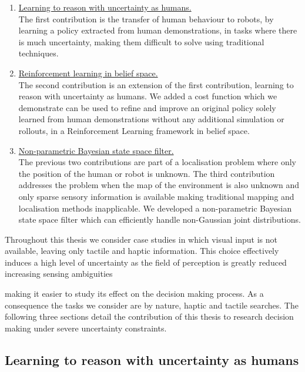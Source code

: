 \begin{enumerate}
 \item[\ref{sub:contr1}] \hyperref[sub:contr1]{Learning to reason with uncertainty as humans.}\\
 The first contribution is the transfer of human behaviour to robots, by learning a policy extracted from 
 human demonstrations, in tasks where there is much uncertainty, making them difficult to solve using traditional techniques.
 \item[\ref{sub:contr2}] \hyperref[sub:contr2]{Reinforcement learning in belief space.}\\
 The second contribution is an extension of the first contribution, learning to reason with uncertainty as humans.
 We added a cost function which we demonstrate can be used to refine and improve an original policy solely learned from human demonstrations
 without any additional simulation or rollouts, in a Reinforcement Learning framework in belief space. 
 \item[\ref{sub:contr3}] \hyperref[sub:contr3]{Non-parametric Bayesian state space filter.}\\
  The previous two contributions are part of a localisation problem where only the position of the human or robot is unknown.
  The third contribution addresses the problem when the map of the environment is also unknown and only sparse sensory information is available
  making traditional mapping and localisation methods inapplicable. We developed a non-parametric Bayesian state space filter which can efficiently
  handle non-Gaussian joint distributions. 
\end{enumerate}

Throughout this thesis we consider case studies in which visual input is not available, leaving only tactile and 
haptic information. This choice effectively induces a high level of uncertainty as the field of perception is greatly reduced increasing 
sensing ambiguities 
 
making it easier to study its effect 
on the decision making process. As a consequence the tasks we consider are by nature, haptic and tactile searches.
The following three sections detail the contribution of this thesis to research decision making under severe 
uncertainty constraints.

\subsection{Learning to reason with uncertainty as humans}\label{sub:contr1}

